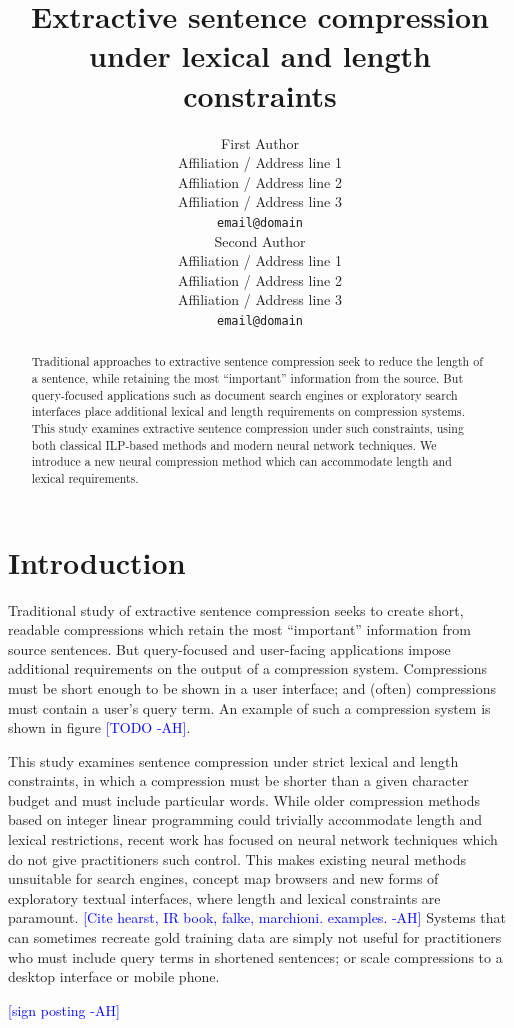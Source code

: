 \documentclass[11pt,a4paper]{article}
\title{Extractive sentence compression under lexical and length constraints}
\author{First Author \\
  Affiliation / Address line 1 \\
  Affiliation / Address line 2 \\
  Affiliation / Address line 3 \\
  {\tt email@domain} \\\And
  Second Author \\
  Affiliation / Address line 1 \\
  Affiliation / Address line 2 \\
  Affiliation / Address line 3 \\
  {\tt email@domain} \\}
\date{}
\newcommand{\ahcomment}[1]{\textcolor{blue}{[#1 -AH]}}
\begin{document}
\maketitle

\begin{abstract}
Traditional approaches to extractive sentence compression seek to reduce the length of a sentence, while retaining the most ``important'' information from the source. But query-focused applications such as document search engines or exploratory search interfaces place additional lexical and length requirements on compression systems. This study examines extractive sentence compression under such constraints, using both classical ILP-based methods and modern neural network techniques. We introduce a new neural compression method which can accommodate length and lexical requirements.
\end{abstract}

\section{Introduction}
Traditional study of extractive sentence compression seeks to create short, readable compressions which retain the most ``important'' information from source sentences. But query-focused and user-facing applications impose additional requirements on the output of a compression system. Compressions must be short enough to be shown in a user interface; and (often) compressions must contain a user's query term. An example of such a compression system is shown in figure \ahcomment{TODO}.


This study examines sentence compression under strict lexical and length constraints, in which a compression must be shorter than a given character budget and must include particular words. While older compression methods based on integer linear programming could trivially accommodate length and lexical restrictions, recent work has focused on neural network techniques which do not give practitioners such control. This makes existing neural methods unsuitable for search engines, concept map browsers and new forms of exploratory textual interfaces, where length and lexical constraints are paramount. \ahcomment{Cite hearst, IR book, falke, marchioni. examples.} Systems that can sometimes recreate gold training data are simply not useful for practitioners who must include query terms in shortened sentences; or scale compressions to a desktop interface or mobile phone.

\ahcomment{sign posting}
\end{document}
